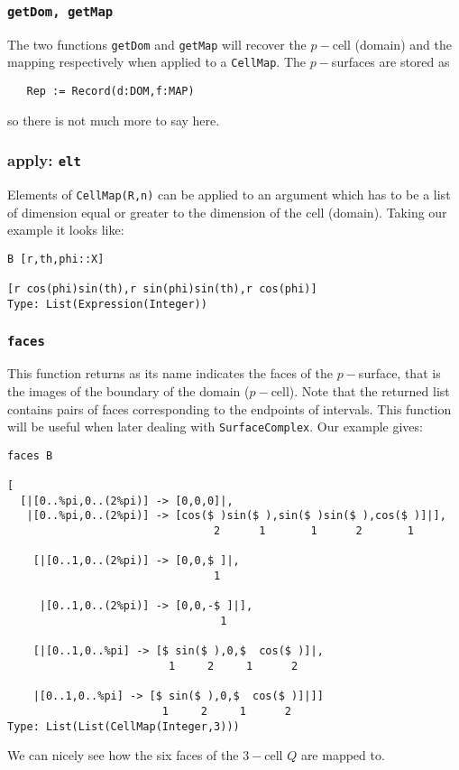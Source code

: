 \documentclass[12pt,a4paper]{article}
\begin{document}
\subsubsection{{\tt getDom, getMap}}
The two functions {\tt getDom} and {\tt getMap} will recover the 
$p-$cell (domain) and the mapping respectively when applied to
a {\tt CellMap}. The $p-$surfaces are stored as
\begin{verbatim}
   Rep := Record(d:DOM,f:MAP)
\end{verbatim}
so there is not much more to say here.
%
\subsubsection{{apply: \tt elt}}
Elements of {\tt CellMap(R,n)} can be applied to an argument which has
to be a list of dimension equal or greater to the dimension of the 
cell (domain). Taking our example it looks like:
\begin{lstlisting}
B [r,th,phi::X]

[r cos(phi)sin(th),r sin(phi)sin(th),r cos(phi)]
Type: List(Expression(Integer))
\end{lstlisting}
%
\subsubsection{{\tt faces}}
This function returns as its name indicates the faces of the $p-$surface, 
that is the images of the boundary of the domain ($p-$cell). Note that 
the returned list contains pairs of faces corresponding to the endpoints 
of intervals. This function will be useful when later dealing with
{\tt SurfaceComplex}. Our example gives:
\scriptsize
\begin{verbatim}
faces B

[
  [|[0..%pi,0..(2%pi)] -> [0,0,0]|,
   |[0..%pi,0..(2%pi)] -> [cos($ )sin($ ),sin($ )sin($ ),cos($ )]|],
                                2      1       1      2       1

    [|[0..1,0..(2%pi)] -> [0,0,$ ]|,
                                1
                              
     |[0..1,0..(2%pi)] -> [0,0,-$ ]|],
                                 1   
                                
    [|[0..1,0..%pi] -> [$ sin($ ),0,$  cos($ )]|,
                         1     2     1      2                   
    
    |[0..1,0..%pi] -> [$ sin($ ),0,$  cos($ )]|]]           
                        1     2     1      2                
Type: List(List(CellMap(Integer,3)))
\end{verbatim}
\normalsize 
We can nicely see how the six faces of the $3-$cell $Q$ are mapped to.
\end{document}
